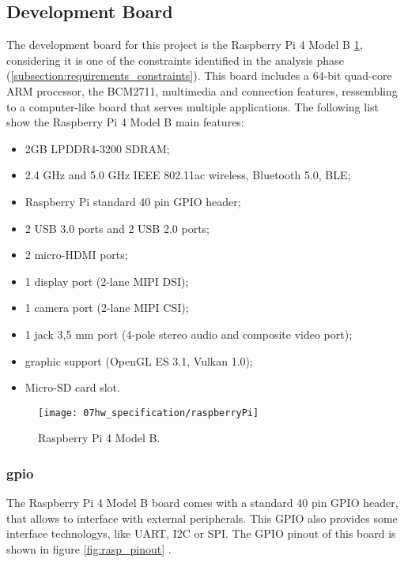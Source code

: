 \subsection{Development Board}

The development board for this project is the Raspberry Pi 4 Model B \ref{fig:rasp}, considering it is one of the constraints identified in the analysis phase (\ref{subsection:requirements_constraints}). This board includes a 64-bit quad-core ARM processor, the BCM2711, multimedia and connection features, ressembling to a computer-like board that serves multiple applications. The following list show the Raspberry Pi 4 Model B main features:

\begin{itemize}
        \item 2GB LPDDR4-3200 SDRAM;
        \item 2.4 GHz and 5.0 GHz IEEE 802.11ac wireless, Bluetooth 5.0, BLE;
        \item Raspberry Pi standard 40 pin GPIO header;   
        \item 2 USB 3.0 ports and 2 USB 2.0 ports;
        \item 2 micro-HDMI ports;
        \item 1 display port (2-lane MIPI DSI);
        \item 1 camera port (2-lane MIPI CSI);
        \item 1 jack 3,5 mm port (4-pole stereo audio and composite video port);
		\item graphic support (OpenGL ES 3.1, Vulkan 1.0);
		\item Micro-SD card slot.
\end{itemize}


\begin{figure}[ht]
	\centering
	\texttt{[image: 07hw\_specification/raspberryPi]}
	\caption{Raspberry Pi 4 Model B.}
	\label{fig:rasp}
\end{figure}

\subsubsection{\ac{gpio}}

The Raspberry Pi 4 Model B board comes with a standard 40 pin GPIO header, that allows to interface with external peripherals. This GPIO also provides some interface technologys, like UART, I2C or SPI. The GPIO pinout of this board is shown in figure \ref{fig:rasp_pinout} \cite{pinout}.

